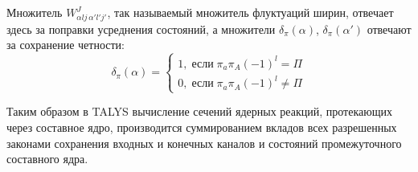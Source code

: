 Множитель $W^J_{\alpha l j \, \alpha' l' j'}$, так называемый множитель флуктуаций ширин, отвечает здесь за поправки усреднения состояний, а множители $\delta_\pi(\alpha)$, $\delta_\pi(\alpha')$ отвечают за сохранение четности:
\begin{equation}
\delta_\pi(\alpha) = \begin{cases}
1, \;\text{если}\; \pi_a \pi_A (-1)^l = \Pi\\
0, \;\text{если}\; \pi_a \pi_A (-1)^l \neq \Pi
\end{cases}
\end{equation}

Таким образом в TALYS вычисление сечений ядерных реакций, протекающих через составное ядро, производится суммированием вкладов всех разрешенных законами сохранения входных и конечных каналов и состояний промежуточного составного ядра.


